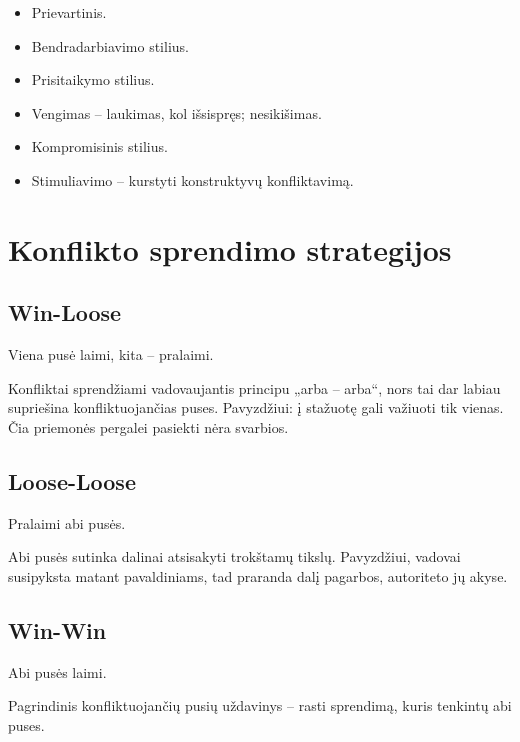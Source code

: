\begin{itemize}
  \item Prievartinis.
  \item Bendradarbiavimo stilius.
  \item Prisitaikymo stilius.
  \item Vengimas – laukimas, kol išsispręs; nesikišimas.
  \item Kompromisinis stilius.
  \item Stimuliavimo – kurstyti konstruktyvų konfliktavimą.
\end{itemize}

\section{Konflikto sprendimo strategijos}

\subsection{Win-Loose}

Viena pusė laimi, kita – pralaimi.

Konfliktai sprendžiami vadovaujantis principu „arba – arba“, nors tai
dar labiau supriešina konfliktuojančias puses. Pavyzdžiui: į stažuotę
gali važiuoti tik vienas. Čia priemonės pergalei pasiekti nėra
svarbios.

\subsection{Loose-Loose}

Pralaimi abi pusės.

Abi pusės sutinka dalinai atsisakyti trokštamų tikslų. Pavyzdžiui, vadovai
susipyksta matant pavaldiniams, tad praranda dalį pagarbos, autoriteto
jų akyse.

\subsection{Win-Win}

Abi pusės laimi.

Pagrindinis konfliktuojančių pusių uždavinys – rasti sprendimą, kuris
tenkintų abi puses.
